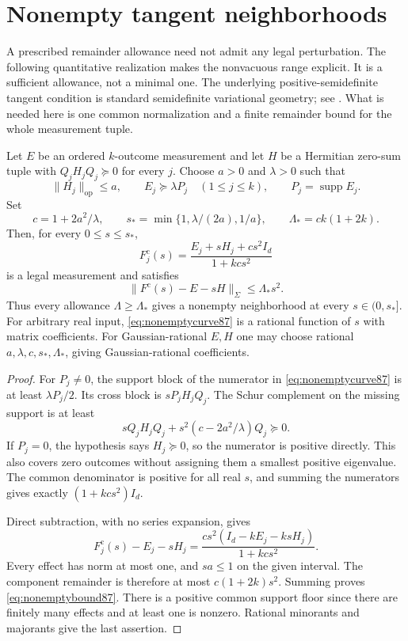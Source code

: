 \section{Nonempty tangent neighborhoods}
\label{sec:nonempty87}
A prescribed remainder allowance need not admit any legal perturbation.
The following quantitative realization makes the nonvacuous range
explicit.  It is a sufficient allowance, not a minimal one.  The
underlying positive-semidefinite tangent condition is standard
semidefinite variational geometry; see \cite{BCS87}.  What is needed
here is one common normalization and a finite remainder bound for the
whole measurement tuple.

\begin{proposition}\label{prop:nonempty87}
Let $E$ be an ordered $k$-outcome measurement and let $H$ be a
Hermitian zero-sum tuple with $Q_jH_jQ_j\succeq0$ for every $j$.
Choose $a>0$ and $\lambda>0$ such that
\[
 \|H_j\|_{\mathrm{op}}\le a,\qquad
 E_j\succeq\lambda P_j\quad(1\le j\le k),
 \qquad P_j=\operatorname{supp}E_j.
\]
Set
\begin{equation}\label{eq:nonemptyconstants87}
 c=1+2a^2/\lambda,\qquad
 s_* =\min\{1,\lambda/(2a),1/a\},\qquad
 \Lambda_* =ck(1+2k).
\end{equation}
Then, for every $0\le s\le s_*$,
\begin{equation}\label{eq:nonemptycurve87}
 F_j^{\mathrm c}(s)=\frac{E_j+sH_j+cs^2I_d}{1+kcs^2}
\end{equation}
is a legal measurement and satisfies
\begin{equation}\label{eq:nonemptybound87}
 \|F^{\mathrm c}(s)-E-sH\|_{\Sigma}\le\Lambda_*s^2.
\end{equation}
Thus every allowance $\Lambda\ge\Lambda_*$ gives a nonempty
neighborhood at every $s\in(0,s_*]$.  For arbitrary real input,
\eqref{eq:nonemptycurve87} is a rational function of $s$ with matrix
coefficients.  For Gaussian-rational $E,H$ one may choose rational
$a,\lambda,c,s_*,\Lambda_*$, giving Gaussian-rational coefficients.
\end{proposition}
\begin{proof}
For $P_j\ne0$, the support block of the numerator in
\eqref{eq:nonemptycurve87} is at least $\lambda P_j/2$.
Its cross block is $sP_jH_jQ_j$.  The Schur complement on the
missing support is at least
\[
 sQ_jH_jQ_j+s^2(c-2a^2/\lambda)Q_j\succeq0.
\]
If $P_j=0$, the hypothesis says $H_j\succeq0$, so the numerator
is positive directly.  This also covers zero outcomes without
assigning them a smallest positive eigenvalue.  The common denominator
is positive for all real $s$, and summing the numerators gives exactly
$(1+kcs^2)I_d$.

Direct subtraction, with no series expansion, gives
\[
 F_j^{\mathrm c}(s)-E_j-sH_j
 =\frac{cs^2(I_d-kE_j-ksH_j)}{1+kcs^2}.
\]
Every effect has norm at most one, and $sa\le1$ on the given
interval.  The component remainder is therefore at most
$c(1+2k)s^2$.  Summing proves \eqref{eq:nonemptybound87}.
There is a positive common support floor since there are finitely
many effects and at least one is nonzero.  Rational minorants and
majorants give the last assertion.
\end{proof}

